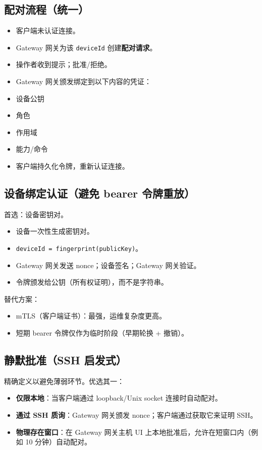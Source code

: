 \subsection{配对流程（统一）}


\begin{itemize}
  \item 客户端未认证连接。
  \item Gateway 网关为该 \texttt{deviceId} 创建\textbf{配对请求}。
  \item 操作者收到提示；批准/拒绝。
  \item Gateway 网关颁发绑定到以下内容的凭证：
  \item 设备公钥
  \item 角色
  \item 作用域
  \item 能力/命令
  \item 客户端持久化令牌，重新认证连接。
\end{itemize}


\subsection{设备绑定认证（避免 bearer 令牌重放）}


首选：设备密钥对。

\begin{itemize}
  \item 设备一次性生成密钥对。
  \item \texttt{deviceId = fingerprint(publicKey)}。
  \item Gateway 网关发送 nonce；设备签名；Gateway 网关验证。
  \item 令牌颁发给公钥（所有权证明），而不是字符串。
\end{itemize}


替代方案：

\begin{itemize}
  \item mTLS（客户端证书）：最强，运维复杂度更高。
  \item 短期 bearer 令牌仅作为临时阶段（早期轮换 + 撤销）。
\end{itemize}


\subsection{静默批准（SSH 启发式）}


精确定义以避免薄弱环节。优选其一：

\begin{itemize}
  \item \textbf{仅限本地}：当客户端通过 loopback/Unix socket 连接时自动配对。
  \item \textbf{通过 SSH 质询}：Gateway 网关颁发 nonce；客户端通过获取它来证明 SSH。
  \item \textbf{物理存在窗口}：在 Gateway 网关主机 UI 上本地批准后，允许在短窗口内（例如 10 分钟）自动配对。
\end{itemize}


